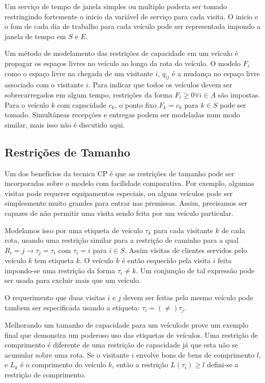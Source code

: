  Um serviço de tempo de janela simples ou multiplo poderia ser tomado restringindo fortemente o
inicio da variável de serviço para cada visita. O inicio e o fom de cada dia de trabalho para cada
veículo pode ser representada impondo a janela de tempo em $S$ e $E$.

 Um método de modelamento das restrições de capacidade em um veículo é propagar os espaços livres no
veículo ao longo da rota do veículo. O modelo $F_i$ como o espaço livre na chegada de um visitante
$i$, $q_{ij}$ é a mudança no espaço livre associado com o visitante $i$. Para indicar que todos os
veículos devem ser sobrecarregados em algum tempo, restrições da forma $F_i \geq 0 \forall i \in A$
são impostas. Para o veículo $k$ com capacidade $c_k$, o ponto fixo $F_k=c_k$ para $k \in S$ pode
ser tomado. Simultâneas recepções e entregas podem ser modeladas num modo similar, mais isso não é
discutido aqui.

\subsection{Restrições de Tamanho}

 Um dos benefícios da tecnica CP é que as restrições de tamanho pode ser incorporadas sobre o modelo
com facilidade comparativa. Por exemplo, algumas visitas pode requerer equipamentos especiais, ou
alguns veículos pode ser simplesmente muito grandes para entrar nas premissas. Assim, precisamos ser
capazes de não permitir uma visita sendo feita por um veículo particular.

 Modelamos isso por uma etiqueta de veículo $\tau_k$ para cada visitante $k$ de cada rota, usando
uma restrição similar para a restrição de caminho para a qual $R_i = j\rightarrow \tau_j=\tau_i$ com
$\tau_i = i$ para $i\in S$. Assim visitas de clientes servidos pelo veículo $k$ tem etiqueta $k$. O
veículo $k$ é então esquecido pela visita $i$ feita impondo-se uma restrição da forma $\tau_i \neq
k$. Um conjunção de tal expressão pode ser usada para excluir mais que um veículo.

 O requerimento que duas visitas $i$ e $j$ devem ser feitas pelo mesmo veículo pode tambem ser
especificada usando a etiqueta: $\tau_i = (\neq ) \tau_j.$

 Melhorando um tamanho de capacidade para um veículode prove um exemplo final que demonstra um
poderoso uso das etiquetas de veículos. Uma restrição de comprimento é diferente de uma restrição de
capacidade já que esta não se acumular sobre uma rota. Se o visitante $i$ envolve bons de bens de
comprimento $l$, e $L_k$ é o comprimento do veículo $k$, então a restrição $L(\tau_i) \geq l$
defini-se a restrição de comprimento.

